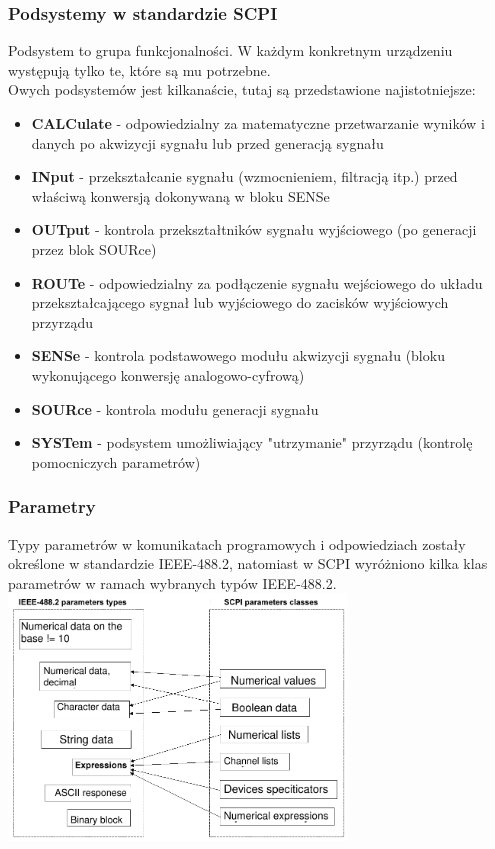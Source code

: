 \subsubsection{Podsystemy w standardzie SCPI}
Podsystem to grupa funkcjonalności. W każdym konkretnym urządzeniu występują tylko te, które są mu potrzebne.\\
Owych podsystemów jest kilkanaście, tutaj są przedstawione najistotniejsze:
\begin{itemize}
	\item \textbf{CALCulate} - odpowiedzialny za matematyczne przetwarzanie wyników i danych po akwizycji sygnału lub przed generacją sygnału
	\item \textbf{INput} - przekształcanie sygnału (wzmocnieniem, filtracją itp.) przed właściwą konwersją dokonywaną w bloku SENSe
	\item \textbf{OUTput} - kontrola przekształtników sygnału wyjściowego (po generacji przez blok SOURce)
	\item \textbf{ROUTe} - odpowiedzialny za podłączenie sygnału wejściowego do układu przekształcającego sygnał lub wyjściowego do zacisków wyjściowych przyrządu
	\item \textbf{SENSe} - kontrola podstawowego modułu akwizycji sygnału (bloku wykonującego konwersję analogowo-cyfrową)
	\item \textbf{SOURce} - kontrola modułu generacji sygnału
	\item \textbf{SYSTem} - podsystem umożliwiający "utrzymanie" przyrządu (kontrolę pomocniczych parametrów)
\end{itemize}

\subsubsection{Parametry}
Typy parametrów w komunikatach programowych i odpowiedziach zostały określone w standardzie IEEE-488.2, natomiast w SCPI wyróżniono kilka klas parametrów w ramach wybranych typów IEEE-488.2.\\
\includegraphics[width=9cm]{./wyklady/IEEE488_SCPI_30_1.pdf}

